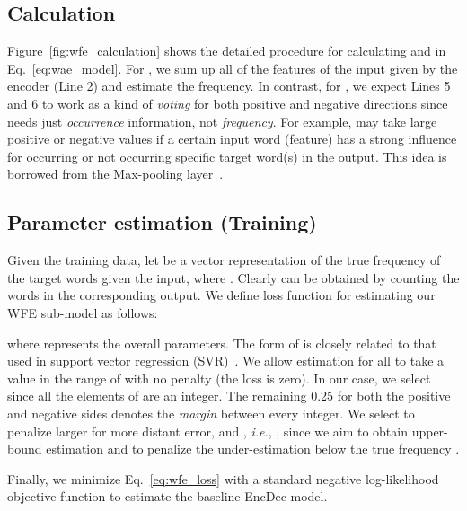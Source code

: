 \documentclass[11pt]{article}
\begin{document}
\subsection{Calculation}
Figure~\ref{fig:wfe_calculation} shows the detailed procedure for calculating  and  in Eq.~\ref{eq:wae_model}.
For , we sum up all of the features of the input given by the encoder (Line 2) and estimate the frequency.
In contrast, for , we expect Lines 5 and 6 to work as a kind of {\it voting} for both positive and negative directions
   since  needs just {\it occurrence} information, not {\it frequency}.
For example,  may take large positive or negative values if a certain input word (feature) has a strong influence for occurring or not occurring specific target word(s) in the output.
This idea is borrowed from the Max-pooling layer~\cite{DBLP:conf/icml/GoodfellowWMCB13}.


\subsection{Parameter estimation (Training)}
Given the training data, let  be a vector representation of the true frequency of the target words given the input, where . 
Clearly  can be obtained by counting the words in the corresponding output.
We define loss function  for estimating our WFE sub-model as follows:

where  represents the overall parameters.
The form of  is closely related to that used in support vector regression (SVR)~\cite{smola2004tutorial}.
We allow estimation  for all  to take a value in the range of  with no penalty (the loss is zero).
In our case, we select  since all the elements of  are an integer.
The remaining 0.25 for both the positive and negative sides denotes the {\it margin} between every integer.
We select  to penalize larger for more distant error, and , {\it i.e.}, , since we aim to obtain upper-bound estimation and to penalize the under-estimation below the true frequency .
   


Finally, we minimize Eq.~\ref{eq:wfe_loss} with a standard negative log-likelihood objective function to estimate the baseline EncDec model.
\end{document}
